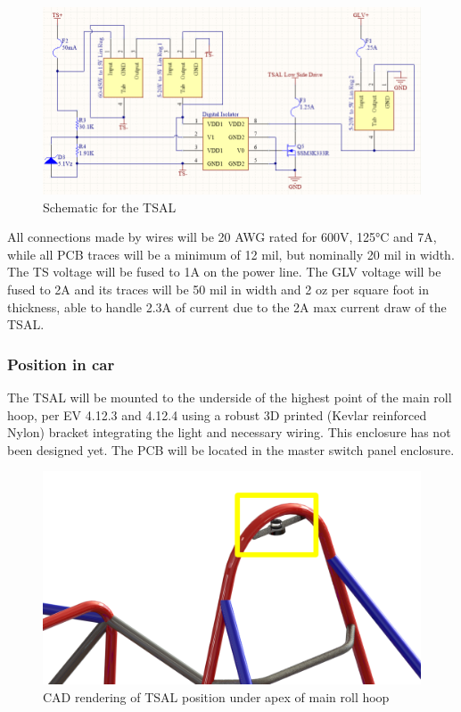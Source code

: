 \documentclass{article}
\begin{document}
\begin{figure}[h]
\centering
\includegraphics[scale=.7]{TSAL}
\caption{Schematic for the TSAL}
\label{fig:TSALcircuit}
\end{figure}

All connections made by wires will be 20 AWG rated for 600V, 125°C and 7A, while all PCB traces will be a minimum of 12 mil, but nominally 20 mil in width. The TS voltage will be fused to 1A on the power line. The GLV voltage will be fused to 2A and its traces will be 50 mil in width and 2 oz per square foot in thickness, able to handle 2.3A of current due to the 2A max current draw of the TSAL.

\subsubsection{Position in car}
The TSAL will be mounted to the underside of the highest point of the main roll hoop, per EV 4.12.3 and 4.12.4 using a robust 3D printed (Kevlar reinforced Nylon) bracket integrating the light and necessary wiring. This enclosure has not been designed yet. The PCB will be located in the master switch panel enclosure.

\begin{figure}[h]
\centering
\includegraphics[scale=1]{TSAL_mounting.png}
\caption{CAD rendering of TSAL position under apex of main roll hoop}
\end{figure}
\end{document}
